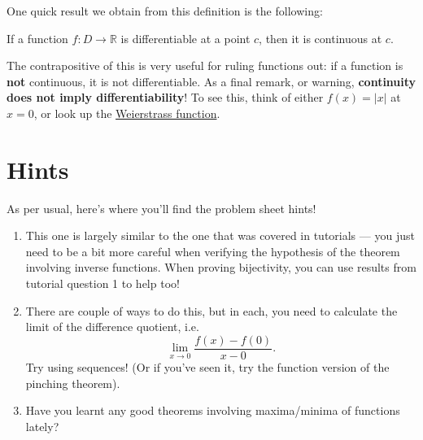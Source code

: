 \documentclass[
  10pt,
  a4paper]{article}
\providecommand{\tightlist}{%
  \setlength{\itemsep}{0pt}\setlength{\parskip}{0pt}}
\theoremstyle{plain}
\theoremstyle{definition}
\theoremstyle{plain}
\theoremstyle{plain}
\theoremstyle{plain}
\theoremstyle{plain}
\theoremstyle{definition}
\theoremstyle{definition}
\theoremstyle{remark}
\theoremstyle{remark}
\let\BeginKnitrBlock\begin \let\EndKnitrBlock\end
\begin{document}
One quick result we obtain from this definition is the following:
\BeginKnitrBlock{proposition}
{\label{prp:prop2} }If a function \(f:D \to \mathbb{R}\) is differentiable at a point \(c\), then it is continuous at \(c\).
\EndKnitrBlock{proposition}
The contrapositive of this is very useful for ruling functions out: if a function is \textbf{not} continuous, it is not differentiable. As a final remark, or warning, \textbf{continuity does not imply differentiability}! To see this, think of either \(f(x) = \lvert x \rvert\) at \(x = 0\), or look up the \href{https://en.wikipedia.org/wiki/Weierstrass_function}{Weierstrass function}.

\hypertarget{hints}{%
\section{Hints}\label{hints}}

As per usual, here's where you'll find the problem sheet hints!

\begin{enumerate}
\def\labelenumi{\arabic{enumi})}
\tightlist
\item
  This one is largely similar to the one that was covered in tutorials --- you just need to be a bit more careful when verifying the hypothesis of the theorem involving inverse functions. When proving bijectivity, you can use results from tutorial question 1 to help too!
\item
  There are couple of ways to do this, but in each, you need to calculate the limit of the difference quotient, i.e.~\[\lim_{x\to 0 }\frac{f(x) - f(0)}{x - 0}.\] Try using sequences! (Or if you've seen it, try the function version of the pinching theorem).
\item
  Have you learnt any good theorems involving maxima/minima of functions lately?
\end{enumerate}
\end{document}
